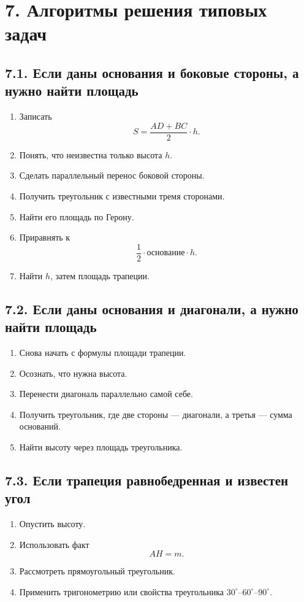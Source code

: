 \documentclass[a4paper,12pt]{article}
\newcommand{\med}{m}
\newcommand{\Area}{S}
\begin{document}
\section*{\textcolor{darkaccent}{7. Алгоритмы решения типовых задач}}

\subsection*{\textcolor{accent}{7.1. Если даны основания и боковые стороны, а нужно найти площадь}}
\begin{enumerate}
    \item Записать
    \[
    \Area=\frac{AD+BC}{2}\cdot h.
    \]
    \item Понять, что неизвестна только высота $h$.
    \item Сделать параллельный перенос боковой стороны.
    \item Получить треугольник с известными тремя сторонами.
    \item Найти его площадь по Герону.
    \item Приравнять к
    \[
    \frac12 \cdot \text{основание} \cdot h.
    \]
    \item Найти $h$, затем площадь трапеции.
\end{enumerate}

\subsection*{\textcolor{accent}{7.2. Если даны основания и диагонали, а нужно найти площадь}}
\begin{enumerate}
    \item Снова начать с формулы площади трапеции.
    \item Осознать, что нужна высота.
    \item Перенести диагональ параллельно самой себе.
    \item Получить треугольник, где две стороны --- диагонали, а третья --- сумма оснований.
    \item Найти высоту через площадь треугольника.
\end{enumerate}

\subsection*{\textcolor{accent}{7.3. Если трапеция равнобедренная и известен угол}}
\begin{enumerate}
    \item Опустить высоту.
    \item Использовать факт
    \[
    AH=\med.
    \]
    \item Рассмотреть прямоугольный треугольник.
    \item Применить тригонометрию или свойства треугольника $30^\circ$--$60^\circ$--$90^\circ$.
\end{enumerate}
\end{document}
